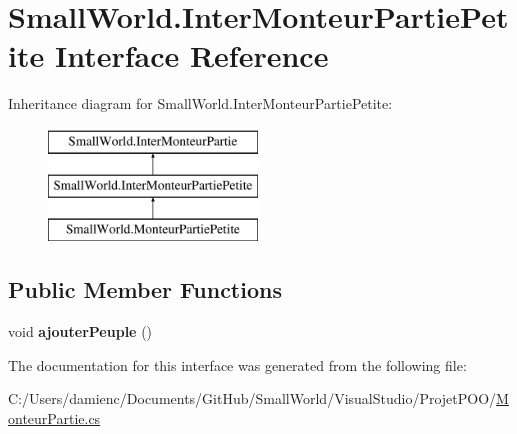 \hypertarget{interface_small_world_1_1_inter_monteur_partie_petite}{\section{Small\-World.\-Inter\-Monteur\-Partie\-Petite Interface Reference}
\label{interface_small_world_1_1_inter_monteur_partie_petite}
}
Inheritance diagram for Small\-World.\-Inter\-Monteur\-Partie\-Petite\-:\begin{figure}[H]
\begin{center}
\leavevmode
\includegraphics[height=3.000000cm]{interface_small_world_1_1_inter_monteur_partie_petite}
\end{center}
\end{figure}
\subsection*{Public Member Functions}
\begin{DoxyCompactItemize}
\item 
\hypertarget{interface_small_world_1_1_inter_monteur_partie_petite_ac4fae6854406afb775d052ac77c5d0b3}{void {\bfseries ajouter\-Peuple} ()}\label{interface_small_world_1_1_inter_monteur_partie_petite_ac4fae6854406afb775d052ac77c5d0b3}

\end{DoxyCompactItemize}


The documentation for this interface was generated from the following file\-:\begin{DoxyCompactItemize}
\item 
C\-:/\-Users/damienc/\-Documents/\-Git\-Hub/\-Small\-World/\-Visual\-Studio/\-Projet\-P\-O\-O/\hyperlink{_monteur_partie_8cs}{Monteur\-Partie.\-cs}\end{DoxyCompactItemize}
